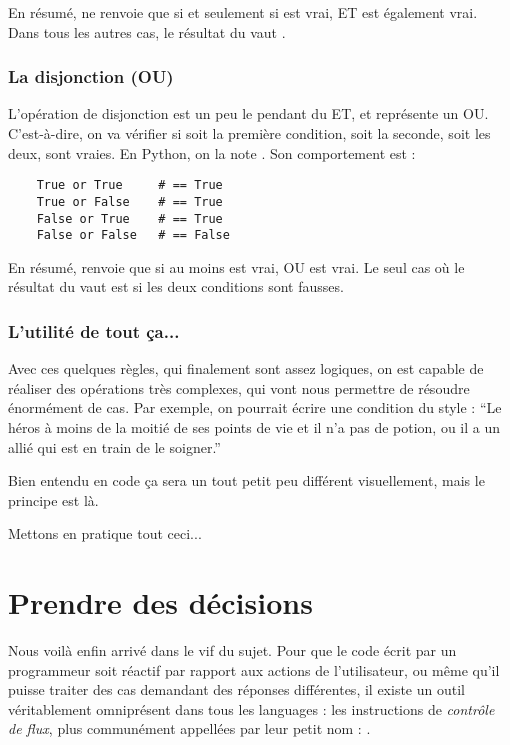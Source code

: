 En résumé,  ne renvoie  que si et seulement si  est vrai, ET  est également vrai. Dans tous les autres cas, le résultat du  vaut .

\subsubsection{La disjonction (OU)}

L'opération de disjonction est un peu le pendant du ET, et représente un OU. C'est-à-dire, on va vérifier si soit la première condition, soit la seconde, soit les deux, sont vraies. En Python, on la note . Son comportement est :

\begin{lstlisting}
    True or True     # == True
    True or False    # == True
    False or True    # == True
    False or False   # == False
\end{lstlisting}

En résumé,  renvoie  que si au moins  est vrai, OU  est vrai. Le seul cas où le résultat du  vaut  est si les deux conditions sont fausses.

\subsubsection{L'utilité de tout ça...}

Avec ces quelques règles, qui finalement sont assez logiques, on est capable de réaliser des opérations très complexes, qui vont nous permettre de résoudre énormément de cas. Par exemple, on pourrait écrire une condition du style : ``Le héros à moins de la moitié de ses points de vie et il n'a pas de potion, ou il a un allié qui est en train de le soigner.''

Bien entendu en code ça sera un tout petit peu différent visuellement, mais le principe est là.

Mettons en pratique tout ceci...

\section{Prendre des décisions}

Nous voilà enfin arrivé dans le vif du sujet. Pour que le code écrit par un programmeur soit réactif par rapport aux actions de l'utilisateur, ou même qu'il puisse traiter des cas demandant des réponses différentes, il existe un outil véritablement omniprésent dans tous les languages : les instructions de \emph{contrôle de flux}, plus communément appellées par leur petit nom : .

